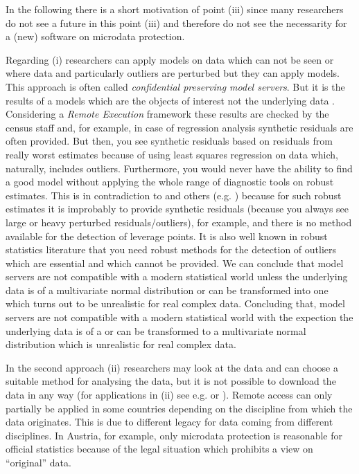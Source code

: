\documentclass[12pt]{article}
\begin{document}
In the following there is a short motivation of point (iii) since many researchers do not see a future in this point (iii) and therefore do not see the necessarity for a (new) software on microdata protection.

Regarding (i) researchers can apply models on data which can not be seen or where data and particularly outliers are perturbed \citep[see e.g. in]{Heitzig06} but they can apply models. This approach is often called {\it confidential preserving model servers}. But it is the results of a models which are the objects of interest not the underlying data \citep{Steel05}. Considering a {\it Remote Execution} framework these results are checked by the census staff and, for example, in case of regression analysis synthetic residuals are often provided. But then, you see synthetic residuals based on residuals from really worst estimates because of using least squares regression on data which, naturally, includes outliers. Furthermore, you would never have the ability to find a good model without applying the whole range of diagnostic tools on robust estimates. This is in contradiction to \cite{Heitzig05} and others (e.g. \cite{Steel05}) because for such robust estimates it is improbably to provide synthetic residuals (because you always see large or heavy perturbed residuals/outliers), for example, and there is no method  available for the detection of leverage points. It is also well known in robust statistics literature that you need robust methods for the detection of outliers which are essential and which cannot be provided. We can conclude that model servers are not compatible with a modern statistical world unless the underlying data is of a multivariate normal distribution or can be transformed into one which turns out to be unrealistic for real complex data. Concluding that, model servers are not compatible with a modern statistical world with the expection the underlying data is of a or can be transformed to a multivariate normal distribution which is unrealistic for real complex data. 

In the second approach (ii) researchers may look at the data and can choose a suitable method for analysing the data, but it is not possible to download the data in any way (for applications in (ii) see e.g. \cite{Hundepool05oh} or \cite{Borchsenius05}). Remote access can only partially be applied in some countries depending on the discipline from which the data originates. This is due to different legacy for data coming from different disciplines. In Austria, for example, only microdata protection is reasonable for official statistics because of the legal situation which prohibits a view on ``original'' data.
\end{document}
